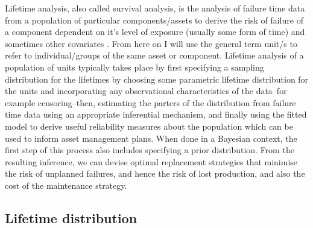 Lifetime analysis, also called survival analysis, is the analysis of failure time data from a population of particular components/assets to derive the risk of failure of a component dependent on it's level of exposure (usually some form of time) and sometimes other covariates \citep{moore2016}. From here on I will use the general term unit/s to refer to individual/groups of the same asset or component. Lifetime analysis of a population of units typically takes place by first specifying a sampling distribution for the lifetimes by choosing some parametric lifetime distribution for the units and incorporating any observational characteristics of the data--for example censoring--then, estimating the parters of the distribution from failure time data using an appropriate inferential mechanism, and finally using the fitted model to derive useful reliability measures about the population which can be used to inform asset management plans. When done in a Bayesian context, the first step of this process also includes specifying a prior distribution. From the resulting inference, we can devise optimal replacement strategies that minimise the risk of unplanned failures, and hence the risk of lost production, and also the cost of the maintenance strategy.

\subsection{Lifetime distribution}

